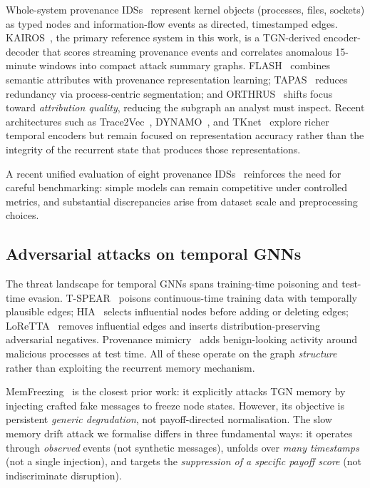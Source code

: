 \documentclass[10pt,twocolumn]{article}
\begin{document}
Whole-system provenance IDSs~\cite{king2003backtracking,bates2015trustworthy}
represent kernel objects (processes, files,
sockets) as typed nodes and information-flow events as directed, timestamped
edges.  KAIROS~\cite{cheng2024kairos}, the primary reference system in this
work, is a TGN-derived encoder-decoder that scores streaming provenance
events and correlates anomalous 15-minute windows into compact attack
summary graphs.  FLASH~\cite{rehman2024flash} combines semantic attributes
with provenance representation learning; TAPAS~\cite{zhang2025tapas} reduces
redundancy via process-centric segmentation; and
ORTHRUS~\cite{jiang2025orthrus} shifts focus toward \emph{attribution
quality}, reducing the subgraph an analyst must inspect.  Recent architectures
such as Trace2Vec~\cite{liu2025trace2vec},
DYNAMO~\cite{wang2026dynamo}, and TKnet~\cite{wang2026tknet} explore richer
temporal encoders but remain focused on representation accuracy rather than
the integrity of the recurrent state that produces those representations.

A recent unified evaluation of eight provenance
IDSs~\cite{bilot2025simpler} reinforces the need for careful benchmarking:
simple models can remain competitive under controlled metrics, and
substantial discrepancies arise from dataset scale and preprocessing
choices.

\subsection{Adversarial attacks on temporal GNNs}

The threat landscape for temporal GNNs spans training-time poisoning and
test-time evasion.  T-SPEAR~\cite{lee2024spear} poisons continuous-time
training data with temporally plausible edges; HIA~\cite{jeon2025hia} selects
influential nodes before adding or deleting edges;
LoReTTA~\cite{pal2025loretta} removes influential edges and inserts
distribution-preserving adversarial negatives.  Provenance
mimicry~\cite{goyal2023mimicry} adds benign-looking activity around malicious
processes at test time.  All of these operate on the graph \emph{structure}
rather than exploiting the recurrent memory mechanism.

MemFreezing~\cite{dai2025memfreezing} is the closest prior work: it
explicitly attacks TGN memory by injecting crafted fake messages to freeze
node states.  However, its objective is persistent
\emph{generic degradation}, not payoff-directed normalisation.  The slow
memory drift attack we formalise differs in three fundamental ways: it
operates through \emph{observed} events (not synthetic messages), unfolds
over \emph{many timestamps} (not a single injection), and targets the
\emph{suppression of a specific payoff score} (not indiscriminate disruption).
\end{document}
